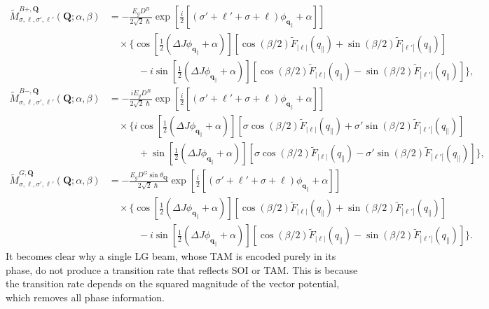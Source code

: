 \begin{equation}
\begin{aligned}
\tilde{M}_{\sigma, \ell, \sigma', \ell'}^{B+, \boldsymbol{Q}}(\boldsymbol{Q};\alpha, \beta)
&= -\frac{E_g D^B}{2\sqrt{2}\hslash} \exp\left[ \tfrac{i}{2} \left[ (\sigma'+\ell'+\sigma+\ell) \phi_{\boldsymbol{q}_\parallel} + \alpha \right] \right] \\
&\quad \times \Bigg\{ 
\cos\left[ \tfrac{1}{2} (\Delta J\phi_{\boldsymbol{q}_\parallel}+\alpha) \right] 
\left[ \cos(\beta/2) \tilde{F}_{|\ell|}(q_\parallel) + \sin(\beta/2) \tilde{F}_{|\ell'|}(q_\parallel) \right] \\
&\quad\qquad - i \sin\left[ \tfrac{1}{2} (\Delta J\phi_{\boldsymbol{q}_\parallel}+\alpha) \right] 
\left[ \cos(\beta/2) \tilde{F}_{|\ell|}(q_\parallel) - \sin(\beta/2) \tilde{F}_{|\ell'|}(q_\parallel) \right] 
\Bigg\}, \\[2ex]
\tilde{M}_{\sigma, \ell, \sigma', \ell'}^{B-, \boldsymbol{Q}}(\boldsymbol{Q};\alpha, \beta)
&= -\frac{iE_g D^B}{2\sqrt{2}\hslash} \exp\left[ \tfrac{i}{2} \left[ (\sigma'+\ell'+\sigma+\ell) \phi_{\boldsymbol{q}_\parallel} + \alpha \right] \right] \\
&\quad \times \Bigg\{ 
i \cos\left[ \tfrac{1}{2} (\Delta J\phi_{\boldsymbol{q}_\parallel}+\alpha) \right] 
\left[ \sigma \cos(\beta/2) \tilde{F}_{|\ell|}(q_\parallel) + \sigma'\sin(\beta/2) \tilde{F}_{|\ell'|}(q_\parallel) \right] \\
&\quad\qquad + \sin\left[ \tfrac{1}{2} (\Delta J\phi_{\boldsymbol{q}_\parallel}+\alpha) \right] 
\left[ \sigma \cos(\beta/2) \tilde{F}_{|\ell|}(q_\parallel) - \sigma'\sin(\beta/2) \tilde{F}_{|\ell'|}(q_\parallel) \right] 
\Bigg\}, \\[2ex]
\tilde{M}_{\sigma, \ell, \sigma', \ell'}^{G, \boldsymbol{Q}}(\boldsymbol{Q};\alpha, \beta)
&= -\frac{E_g D^G \sin\theta_{\boldsymbol{Q}}}{2\sqrt{2}\hslash} \exp\left[ \tfrac{i}{2} \left[ (\sigma'+\ell'+\sigma+\ell) \phi_{\boldsymbol{q}_\parallel} + \alpha \right] \right] \\
&\quad \times \Bigg\{ 
\cos\left[ \tfrac{1}{2} (\Delta J\phi_{\boldsymbol{q}_\parallel}+\alpha) \right] 
\left[ \cos(\beta/2) \tilde{F}_{|\ell|}(q_\parallel) + \sin(\beta/2) \tilde{F}_{|\ell'|}(q_\parallel) \right] \\
&\quad\qquad - i \sin\left[ \tfrac{1}{2} (\Delta J\phi_{\boldsymbol{q}_\parallel}+\alpha) \right] 
\left[ \cos(\beta/2) \tilde{F}_{|\ell|}(q_\parallel) - \sin(\beta/2) \tilde{F}_{|\ell'|}(q_\parallel) \right] 
\Bigg\}.
\end{aligned}
\end{equation} 
It becomes clear why a single LG beam, whose TAM is encoded purely in its phase, do not produce a transition rate that reflects SOI or TAM. This is because the transition rate depends on the squared magnitude of the vector potential, which removes all phase information.
%
%
%
%
%
%
